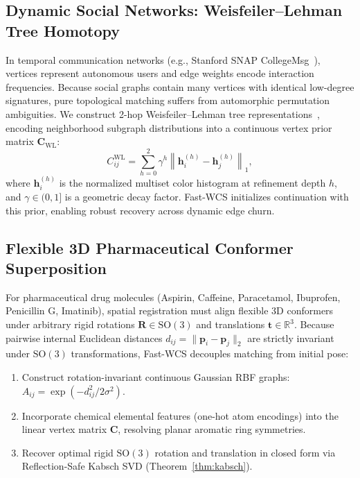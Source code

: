 \documentclass[a4paper,fleqn]{cas-dc}
\theoremstyle{thmstyleone}
\theoremstyle{thmstyletwo}
\theoremstyle{thmstylethree}
\begin{document}
\subsection{Dynamic Social Networks: Weisfeiler--Lehman Tree Homotopy}
In temporal communication networks (e.g., Stanford SNAP CollegeMsg~\cite{panzarasa2009}), vertices represent autonomous users and edge weights encode interaction frequencies. Because social graphs contain many vertices with identical low-degree signatures, pure topological matching suffers from automorphic permutation ambiguities. We construct 2-hop Weisfeiler--Lehman tree representations~\cite{shervashidze2011weisfeiler, kriege2016valid}, encoding neighborhood subgraph distributions into a continuous vertex prior matrix $\mathbf{C}_{\text{WL}}$:
\begin{equation}
C_{ij}^{\text{WL}} = \sum_{h=0}^2 \gamma^h \left\| \mathbf{h}_i^{(h)} - \mathbf{h}_j^{(h)} \right\|_1,
\label{eq:wl_prior}
\end{equation}
where $\mathbf{h}_i^{(h)}$ is the normalized multiset color histogram at refinement depth $h$, and $\gamma \in (0, 1]$ is a geometric decay factor. Fast-WCS initializes continuation with this prior, enabling robust recovery across dynamic edge churn.

\subsection{Flexible 3D Pharmaceutical Conformer Superposition}
For pharmaceutical drug molecules (Aspirin, Caffeine, Paracetamol, Ibuprofen, Penicillin G, Imatinib), spatial registration must align flexible 3D conformers under arbitrary rigid rotations $\mathbf{R} \in \mathrm{SO}(3)$ and translations $\mathbf{t} \in \mathbb{R}^3$. Because pairwise internal Euclidean distances $d_{ij} = \|\mathbf{p}_i - \mathbf{p}_j\|_2$ are strictly invariant under $\mathrm{SO}(3)$ transformations, Fast-WCS decouples matching from initial pose:
\begin{enumerate}
    \item Construct rotation-invariant continuous Gaussian RBF graphs: $A_{ij} = \exp(-d_{ij}^2 / 2\sigma^2)$.
    \item Incorporate chemical elemental features (one-hot atom encodings) into the linear vertex matrix $\mathbf{C}$, resolving planar aromatic ring symmetries.
    \item Recover optimal rigid $\mathrm{SO}(3)$ rotation and translation in closed form via Reflection-Safe Kabsch SVD (Theorem~\ref{thm:kabsch}).
\end{enumerate}
\end{document}
